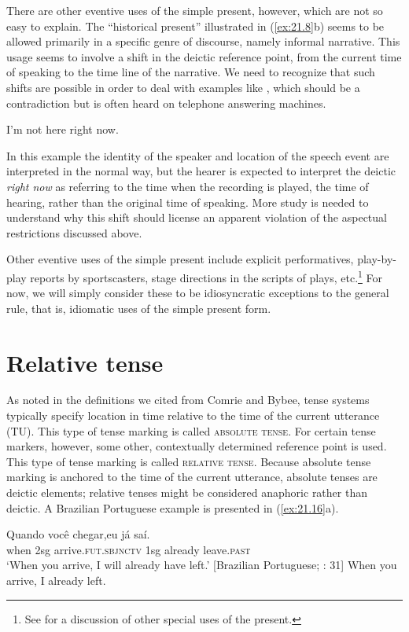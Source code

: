 There are other eventive uses of the simple present, however, which are not so easy to explain. The “historical present” illustrated in (\ref{ex:21.8}b) seems to be allowed primarily in a specific genre of discourse, namely informal narrative. This usage seems to involve a shift in the deictic reference point, from the current time of speaking to the time line of the narrative. We need to recognize that such shifts are possible in order to deal with examples like , which should be a contradiction but is often heard on telephone answering machines.


\ea \label{ex:21.15}
I’m not here right now.
\z


In this example the identity of the speaker and location of the speech event are interpreted in the normal way, but the hearer is expected to interpret the deictic \textit{right now} as referring to the time when the recording is played, the time of hearing, rather than the original time of speaking. More study is needed to understand why this shift should license an apparent violation of the aspectual restrictions discussed above.



Other eventive uses of the simple present include explicit performatives, play-by-play reports by sportscasters, stage directions in the scripts of plays, etc.\footnote{See \citet{Klein2009} for a discussion of other special uses of the present.} For now, we will simply consider these to be idiosyncratic exceptions to the general rule, that is, idiomatic uses of the simple present form.


\section{Relative tense}\label{sec:21.4}

As noted in the definitions we cited from Comrie and Bybee, tense systems typically specify location in time relative to the time of the current utterance (TU). This type of tense marking is called \textsc{absolute tense}. For certain tense markers, however, some other, contextually determined reference point is used. This type of tense marking is called \textsc{relative tense}. Because absolute tense marking is anchored to the time of the current utterance, absolute tenses are deictic elements; relative tenses might be considered anaphoric rather than deictic. A Brazilian Portuguese example is presented in (\ref{ex:21.16}a).


\ea \label{ex:21.16}
\ea  \gll Quando  você  chegar,\footnotemark  eu  já  saí.\\
when  2sg  arrive.\textsc{fut.sbjnctv}  1sg  already  leave.\textsc{past}\\
\glt ‘When you arrive, I will already have left.’   [Brazilian Portuguese; \citealt{Comrie1985}: 31]
\ex   *When you arrive, I already left.
\z \z
{}


